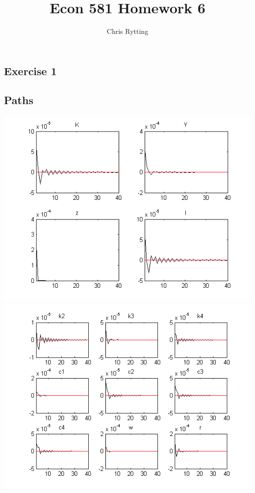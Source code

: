 \documentclass[letterpaper,12pt]{article}
\theoremstyle{definition}
\begin{document}
\title{Econ 581 Homework 6}
\author{Chris Rytting}
\maketitle
\subsection*{Exercise 1}


\subsection*{Paths}


\includegraphics[scale = .8]{ans1}\\

\includegraphics[scale = .8]{ans2}\\
\end{document}
